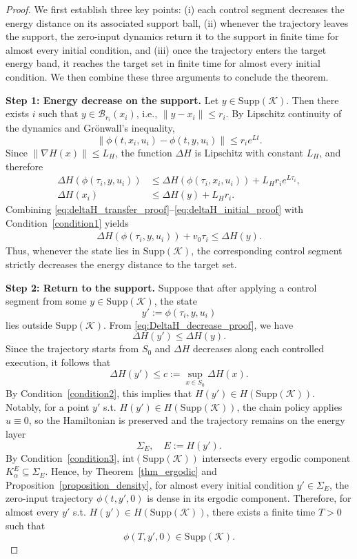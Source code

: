 \documentclass[letterpaper, 10 pt, conference]{ieeeconf}
\newcommand{\Supp}{\mathrm{Supp}}
\begin{document}
\begin{proof}
We first establish three key points:  
(i) each control segment decreases the energy distance on its associated support ball,  
(ii) whenever the trajectory leaves the support, the zero-input dynamics return it to the support in finite time for almost every initial condition, and  
(iii) once the trajectory enters the target energy band, it reaches the target set in finite time for almost every initial condition.  
We then combine these three arguments to conclude the theorem.

\medskip
\noindent\textbf{Step 1: Energy decrease on the support.}
Let $y \in \Supp(\mathcal{K})$. Then there exists $i$ such that $y \in \mathcal{B}_{r_i}(x_i)$, i.e., $\|y-x_i\|\le r_i$. By Lipschitz continuity of the dynamics and Grönwall’s inequality,
\[
\|\phi(t,x_i,u_i)-\phi(t,y,u_i)\|\le r_i e^{Lt}.
\]
Since $\|\nabla H(x)\|\le L_H$, the function $\Delta H$ is Lipschitz with constant $L_H$, and therefore
\begin{align}
\label{eq:deltaH_transfer_proof}
\Delta H(\phi(\tau_i,y,u_i))
&\le \Delta H(\phi(\tau_i,x_i,u_i)) + L_H r_i e^{L\tau_i},\\
\label{eq:deltaH_initial_proof}
\Delta H(x_i)
&\le \Delta H(y) + L_H r_i.
\end{align}
Combining \eqref{eq:deltaH_transfer_proof}--\eqref{eq:deltaH_initial_proof} with Condition~\ref{condition1} yields
\begin{align}
\label{eq:DeltaH_decrease_proof}
\Delta H(\phi(\tau_i,y,u_i)) + v_0\tau_i \le \Delta H(y).
\end{align}
Thus, whenever the state lies in $\Supp(\mathcal{K})$, the corresponding control segment strictly decreases the energy distance to the target set.

\medskip
\noindent\textbf{Step 2: Return to the support.}
Suppose that after applying a control segment from some $y\in \Supp(\mathcal{K})$, the state
\[
y':=\phi(\tau_i,y,u_i)
\]
lies outside $\Supp(\mathcal{K})$. From \eqref{eq:DeltaH_decrease_proof}, we have
\[
\Delta H(y') \le \Delta H(y).
\]
Since the trajectory starts from $S_0$ and $\Delta H$ decreases along each controlled execution, it follows that
\[
\Delta H(y') \le c := \sup_{x\in S_0}\Delta H(x).
\]
By Condition~\ref{condition2}, this implies that $H(y')\in H(\Supp(\mathcal{K}))$. Notably, for a point $y'$ s.t. $H(y')\in H(\Supp(\mathcal{K}))$,  the chain policy applies $u\equiv 0$, so the Hamiltonian is preserved and the trajectory remains on the energy layer
\[
\Sigma_E, \quad E:=H(y').
\]
By Condition~\ref{condition3}, $\mathrm{int}(\Supp(\mathcal{K}))$ intersects every ergodic component $K_\alpha^E\subseteq \Sigma_E$. Hence, by Theorem~\ref{thm_ergodic} and Proposition~\ref{proposition_density}, for almost every initial condition $y'\in \Sigma_E$, the zero-input trajectory $\phi(t,y',0)$ is dense in its ergodic component. Therefore, for almost every $y'$ s.t. $H(y')\in H(\Supp(\mathcal{K}))$,  there exists a finite time $T>0$ such that
\[
\phi(T,y',0)\in \Supp(\mathcal{K}).
\]


\end{proof}
\end{document}
